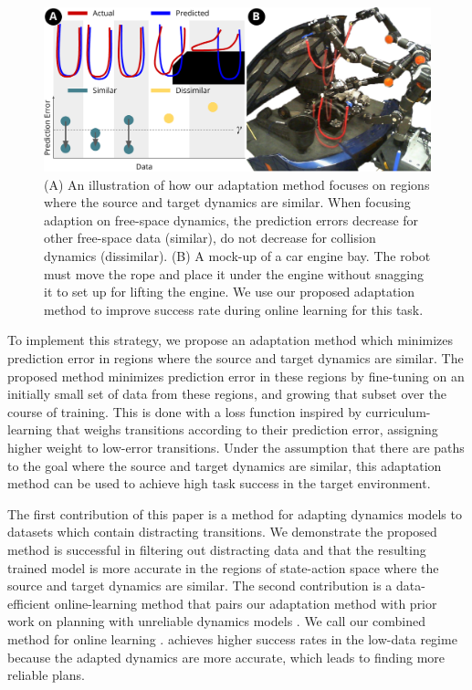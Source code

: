 \begin{figure}
    \centering
    \includegraphics[width=1\linewidth]{Chap4/images/title_figure.pdf}
    \caption{
    (A) An illustration of how our adaptation method focuses on regions where the source and target dynamics are similar. When focusing adaption on free-space dynamics, the prediction errors decrease for other free-space data (similar), do not decrease for collision dynamics (dissimilar).
    (B) A mock-up of a car engine bay. The robot must move the rope and place it under the engine without snagging it to set up for lifting the engine. We use our proposed adaptation method to improve success rate during online learning for this task.}
    \label{ICRA:fig:real_robot_setup}
\end{figure}

To implement this strategy, we propose an adaptation method which minimizes prediction error in regions where the source and target dynamics are similar. The proposed method minimizes prediction error in these regions by fine-tuning on an initially small set of data from these regions, and growing that subset over the course of training. This is done with a loss function inspired by curriculum-learning that weighs transitions according to their prediction error, assigning higher weight to low-error transitions. Under the assumption that there are paths to the goal where the source and target dynamics are similar, this adaptation method can be used to achieve high task success in the target environment.

The first contribution of this paper is a method for adapting dynamics models to datasets which contain distracting transitions. We demonstrate the proposed method is successful in filtering out distracting data and that the resulting trained model is more accurate in the regions of state-action space where the source and target dynamics are similar. The second contribution is a data-efficient online-learning method that pairs our adaptation method with prior work on planning with unreliable dynamics models \cite{UnreliableMitrano2021,MDEs22}. We call our combined method for online learning \FOCUS{}. \FOCUS{} achieves higher success rates in the low-data regime because the adapted dynamics are more accurate, which leads to finding more reliable plans.